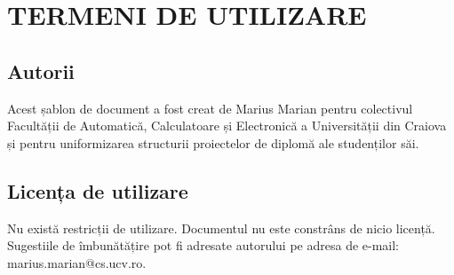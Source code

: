 \chapter{TERMENI DE UTILIZARE}

\section{Autorii}

Acest șablon de document a fost creat de Marius Marian pentru colectivul Facultății 
de Automatică, Calculatoare și Electronică a Universității din Craiova și pentru 
uniformizarea structurii proiectelor de diplomă ale studenților săi.

\section{Licența de utilizare}

Nu există restricții de utilizare. Documentul nu este constrâns de nicio licență. 
Sugestiile de îmbunătățire pot fi adresate autorului pe adresa de e-mail: marius.marian@cs.ucv.ro.